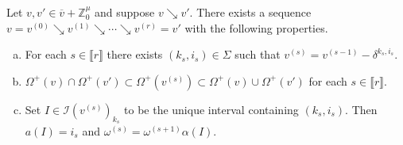 \documentclass[11pt,fleqn]{article}
\newcommand\ZZ{\mathbb Z}
\newcommand\I{\mathcal I}
\newcommand\interval[1]{\llbracket #1 \rrbracket}
\begin{document}
\begin{Lemma}
\label{L:sequence}
Let $v,v' \in \overline v + \ZZ^\mu_0$ and suppose $v \searrow v'$. 
There exists a sequence $v = v^{(0)} \searrow v^{(1)} \searrow \cdots \searrow 
v^{(r)} = v'$ with the following properties.
\begin{enumerate}[(a)]
\item 
\label{i:ik}
For each $s \in \interval{r}$ there exists $(k_s, i_s) \in \Sigma$ such 
that $v^{(s)} = v^{(s-1)} - \delta^{k_s,i_s}$.

\item 
\label{i:omega}
$\Omega^+(v) \cap \Omega^+(v') \subset \Omega^+(v^{(s)}) \subset
\Omega^+(v) \cup \Omega^+(v')$ for each $s \in \interval{r}$.

\item 
\label{i:interval}
Set $I \in \I(v^{(s)})_{k_s}$ to be the unique interval containing $(k_s,
i_s)$. Then $a(I) = i_s$ and $\omega^{(s)} = \omega^{(s+1)} \alpha(I)$. 
\end{enumerate}

\end{Lemma}
\end{document}
